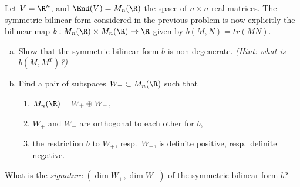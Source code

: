 \begin{problem}
Let $V=\R^n$, and $\End(V)=M_n(\R)$ the space of $n\times n$ real matrices. The symmetric bilinear form considered in the previous problem is now explicitly the bilinear map $b:M_n(\R)\times M_n(\R)\to\R$ given by $b(M,N)=tr(MN)$.
\begin{enumerate}[(a)]
  \item Show that the symmetric bilinear form $b$ is non-degenerate.
  \textit{(Hint: what is $b(M,M^T)$?)}
  \item Find a pair of subspaces $W_\pm\subset M_n(\R)$ such that
  \begin{enumerate}[(1)]
    \item $M_n(\R)=W_+\oplus W_-$,
    \item $W_+$ and $W_-$ are orthogonal to each other for
    $b$,
    \item the restriction $b$ to $W_+$, resp.\ $W_-$, is definite 
    positive, resp.\ definite negative.
  \end{enumerate}
\end{enumerate}
What is the {\em signature} $(\dim W_+,\dim W_-)$ of the symmetric bilinear form $b$?
\end{problem}
